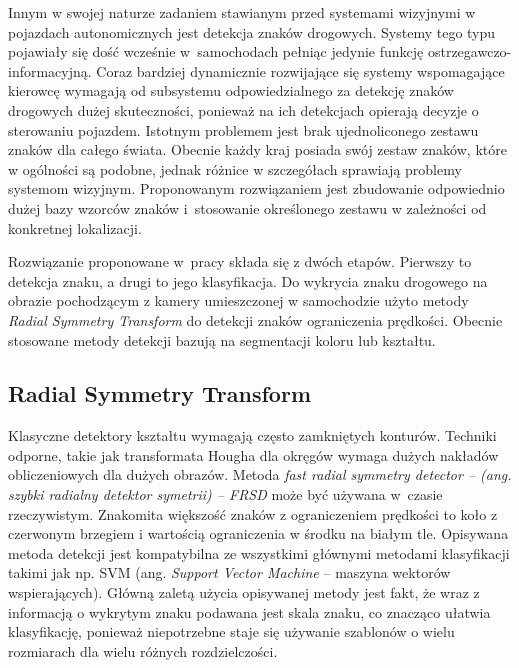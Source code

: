 Innym w swojej naturze zadaniem stawianym przed systemami wizyjnymi w pojazdach autonomicznych jest detekcja znaków drogowych. %
Systemy tego typu pojawiały się dość wcześnie w~samochodach pełniąc jedynie funkcję ostrzegawczo-informacyjną.
Coraz bardziej dynamicznie rozwijające się systemy wspomagające kierowcę wymagają od subsystemu odpowiedzialnego za detekcję znaków drogowych dużej skuteczności, ponieważ na ich detekcjach opierają decyzje o sterowaniu pojazdem. %
Istotnym problemem jest brak ujednoliconego zestawu znaków dla całego świata. %
Obecnie każdy kraj posiada swój zestaw znaków, które w ogólności są podobne, jednak różnice w szczegółach sprawiają problemy systemom wizyjnym. %
Proponowanym rozwiązaniem jest zbudowanie odpowiednio dużej bazy wzorców znaków i~stosowanie określonego zestawu w zależności od konkretnej lokalizacji. 

Rozwiązanie proponowane w~pracy \cite{T2} składa się z dwóch etapów. 
Pierwszy to detekcja znaku, a drugi to jego klasyfikacja. 
Do wykrycia znaku drogowego na obrazie pochodzącym z kamery umieszczonej w samochodzie użyto metody \textit{Radial Symmetry Transform} do detekcji znaków ograniczenia prędkości. 
Obecnie stosowane metody detekcji bazują na segmentacji koloru lub kształtu. %

\subsection{Radial Symmetry Transform}

Klasyczne detektory kształtu wymagają często zamkniętych konturów. 
Techniki odporne, takie jak transformata Hougha dla okręgów wymaga dużych nakładów obliczeniowych dla dużych obrazów. 
Metoda \textit{\textit{fast radial symmetry detector} -- (ang. szybki radialny detektor symetrii) -- FRSD} może być używana w~czasie rzeczywistym. %
Znakomita większość znaków z ograniczeniem prędkości to koło z czerwonym brzegiem i wartością ograniczenia w środku na białym tle. 
Opisywana metoda detekcji jest kompatybilna ze wszystkimi głównymi metodami klasyfikacji takimi jak np. SVM (ang. \textit{Support Vector Machine} -- maszyna wektorów wspierających). 
Główną zaletą użycia opisywanej metody jest fakt, że wraz z informacją o wykrytym znaku podawana jest skala znaku, co znacząco ułatwia klasyfikację, ponieważ niepotrzebne staje się używanie szablonów o wielu rozmiarach dla wielu różnych rozdzielczości. %

